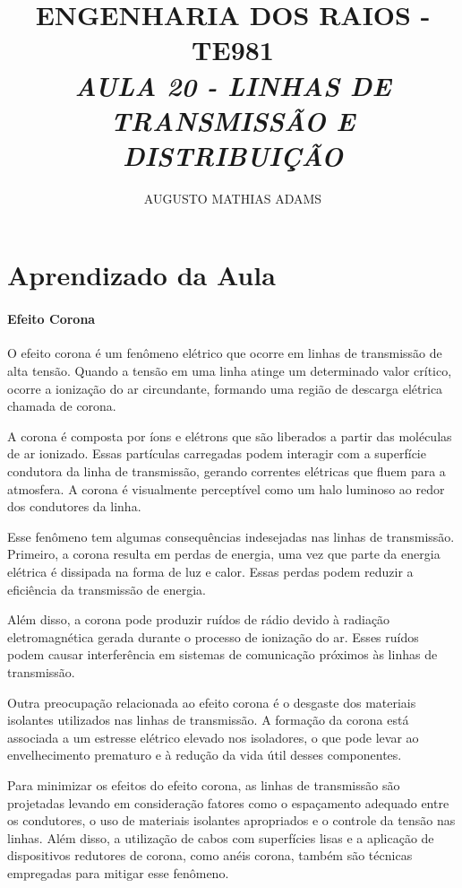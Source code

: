 \documentclass[a4paper, 12pt, onecolumn,singlespacing]{article}
\title{\normalsize{ENGENHARIA DOS RAIOS - TE981}\\ \huge{\textbf\textit{{AULA 20 - LINHAS DE TRANSMISSÃO E DISTRIBUIÇÃO}}\\}}
\author{\small{AUGUSTO MATHIAS ADAMS}}
\begin{document}
	
	\maketitle
	
	\section{Aprendizado da Aula}
		
		\paragraph{Efeito Corona}
		
		O efeito corona é um fenômeno elétrico que ocorre em linhas de transmissão de alta tensão. Quando a tensão em uma linha atinge um determinado valor crítico, ocorre a ionização do ar circundante, formando uma região de descarga elétrica chamada de corona.
		
		A corona é composta por íons e elétrons que são liberados a partir das moléculas de ar ionizado. Essas partículas carregadas podem interagir com a superfície condutora da linha de transmissão, gerando correntes elétricas que fluem para a atmosfera. A corona é visualmente perceptível como um halo luminoso ao redor dos condutores da linha.
		
		Esse fenômeno tem algumas consequências indesejadas nas linhas de transmissão. Primeiro, a corona resulta em perdas de energia, uma vez que parte da energia elétrica é dissipada na forma de luz e calor. Essas perdas podem reduzir a eficiência da transmissão de energia.
		
		Além disso, a corona pode produzir ruídos de rádio devido à radiação eletromagnética gerada durante o processo de ionização do ar. Esses ruídos podem causar interferência em sistemas de comunicação próximos às linhas de transmissão.
		
		Outra preocupação relacionada ao efeito corona é o desgaste dos materiais isolantes utilizados nas linhas de transmissão. A formação da corona está associada a um estresse elétrico elevado nos isoladores, o que pode levar ao envelhecimento prematuro e à redução da vida útil desses componentes.
		
		Para minimizar os efeitos do efeito corona, as linhas de transmissão são projetadas levando em consideração fatores como o espaçamento adequado entre os condutores, o uso de materiais isolantes apropriados e o controle da tensão nas linhas. Além disso, a utilização de cabos com superfícies lisas e a aplicação de dispositivos redutores de corona, como anéis corona, também são técnicas empregadas para mitigar esse fenômeno.
		
\end{document}
